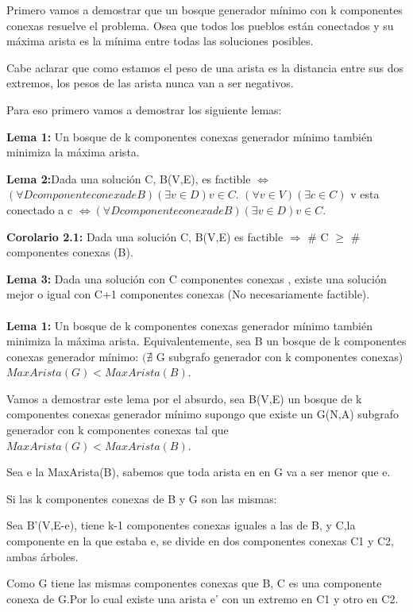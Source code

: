 Primero vamos a demostrar que un bosque generador mínimo con k componentes conexas resuelve el problema. Osea que todos los pueblos están conectados y su máxima arista es la mínima entre todas las soluciones posibles.

Cabe aclarar que como estamos el peso de una arista es la distancia entre sus dos extremos, los pesos de las arista nunca van a ser negativos.

Para eso primero vamos a demostrar los siguiente lemas:

\textbf{Lema 1:} Un bosque de k componentes conexas generador mínimo también minimiza la máxima arista.

\textbf{Lema 2:}Dada una solución C, B(V,E), es factible $\Longleftrightarrow$ $(\forall D componente conexa de B)(\exists v \in D) v \in C$.  $(\forall v \in V)(\exists c \in C)$ v esta conectado a c $\Leftrightarrow (\forall D componente conexa de B)(\exists v \in D) v \in C$.

\textbf{Corolario 2.1:} Dada una solución C, B(V,E) es factible $\Rightarrow$ \# C $\geq$ \# componentes conexas (B).

\textbf{Lema 3:} Dada una solución con C componentes conexas , existe una solución mejor o igual con C+1 componentes conexas (No necesariamente factible). \\ \\ 


\textbf{Lema 1:} Un bosque de k componentes conexas generador mínimo también minimiza la máxima arista. Equivalentemente, sea B un bosque de k componentes conexas generador mínimo: $(\nexists$ G subgrafo generador con k componentes conexas) $MaxArista(G) < MaxArista(B)$.

Vamos a demostrar este lema por el absurdo, sea B(V,E) un bosque de k componentes conexas generador mínimo supongo que existe un G(N,A) subgrafo generador con k componentes conexas tal que $MaxArista(G) < MaxArista(B)$.

Sea e la MaxArista(B), sabemos que toda arista en en G va a ser menor que e.

Si las k componentes conexas de B y G son las mismas:

Sea B'(V,E-e), tiene k-1 componentes conexas iguales a las de B, y C,la componente en la que estaba e, se divide en dos componentes conexas C1 y C2, ambas árboles.

Como G tiene las mismas componentes conexas que B, C es una componente conexa de G.Por lo cual existe una arista e' con un extremo en C1 y otro en C2.

